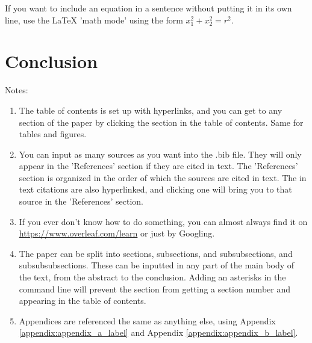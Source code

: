 \documentclass{article}
\newcounter{subsubsubsection}[subsubsection]
\begin{document}
\par If you want to include an equation in a sentence without putting it in its own line, use the LaTeX 'math mode' using the form $x_{1}^{2}+x_{2}^{2}=r^{2}$. 


\section{Conclusion}



\par Notes: 
\begin{enumerate}
    \item The table of contents is set up with hyperlinks, and you can get to any section of the paper by clicking the section in the table of contents. Same for tables and figures. 
    \item You can input as many sources as you want into the .bib file. They will only appear in the 'References' section if they are cited in text. The 'References' section is organized in the order of which the sources are cited in text. The in text citations are also hyperlinked, and clicking one will bring you to that source in the 'References' section. 
    \item If you ever don't know how to do something, you can almost always find it on \url{https://www.overleaf.com/learn} or just by Googling. 
    \item The paper can be split into sections, subsections, and subsubsections, and subsubsubsections. These can be inputted in any part of the main body of the text, from the abstract to the conclusion. Adding an asterisks in the command line will prevent the section from getting a section number and appearing in the table of contents.
    \item Appendices are referenced the same as anything else, using Appendix \ref{appendix:appendix_a_label} and Appendix \ref{appendix:appendix_b_label}.
\end{enumerate}


\end{document}
